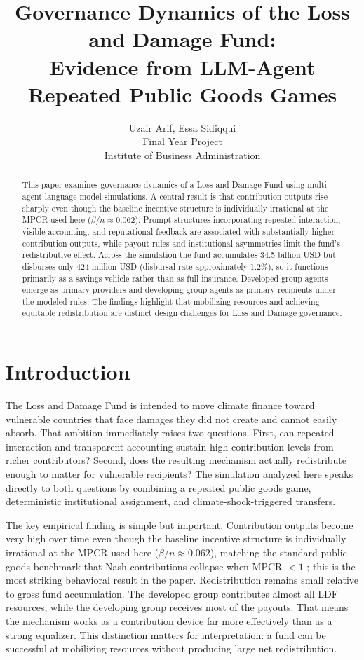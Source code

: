 \documentclass[12pt,letterpaper]{article}
\title{%
  Governance Dynamics of the Loss and Damage Fund: \\
  Evidence from LLM-Agent Repeated Public Goods Games
}
\author{%
  {\small Uzair Arif, Essa Sidiqqui}\\[-0.6ex]
  {\footnotesize Final Year Project}\\[-0.6ex]
  {\footnotesize Institute of Business Administration}%
}
\begin{document}
\maketitle

\begin{abstract}
This paper examines governance dynamics of a Loss and Damage Fund using multi-agent language-model simulations. A central result is that contribution outputs rise sharply even though the baseline incentive structure is individually irrational at the MPCR used here (\(\beta/n \approx 0.062\)). Prompt structures incorporating repeated interaction, visible accounting, and reputational feedback are associated with substantially higher contribution outputs, while payout rules and institutional asymmetries limit the fund's redistributive effect. Across the simulation the fund accumulates 34.5 billion USD but disburses only 424 million USD (disbursal rate approximately 1.2\%), so it functions primarily as a savings vehicle rather than as full insurance. Developed-group agents emerge as primary providers and developing-group agents as primary recipients under the modeled rules. The findings highlight that mobilizing resources and achieving equitable redistribution are distinct design challenges for Loss and Damage governance.
\end{abstract}

\section{Introduction}

The Loss and Damage Fund is intended to move climate finance toward vulnerable countries that face damages they did not create and cannot easily absorb. That ambition immediately raises two questions. First, can repeated interaction and transparent accounting sustain high contribution levels from richer contributors? Second, does the resulting mechanism actually redistribute enough to matter for vulnerable recipients? The simulation analyzed here speaks directly to both questions by combining a repeated public goods game, deterministic institutional assignment, and climate-shock-triggered transfers.

The key empirical finding is simple but important. Contribution outputs become very high over time even though the baseline incentive structure is individually irrational at the MPCR used here (\(\beta/n \approx 0.062\)), matching the standard public-goods benchmark that Nash contributions collapse when MPCR $< 1$ \citep{ledyard1995,isaacwalker1988,isaacwalkerwilliams1994}; this is the most striking behavioral result in the paper. Redistribution remains small relative to gross fund accumulation. The developed group contributes almost all LDF resources, while the developing group receives most of the payouts. That means the mechanism works as a contribution device far more effectively than as a strong equalizer. This distinction matters for interpretation: a fund can be successful at mobilizing resources without producing large net redistribution.
\end{document}
